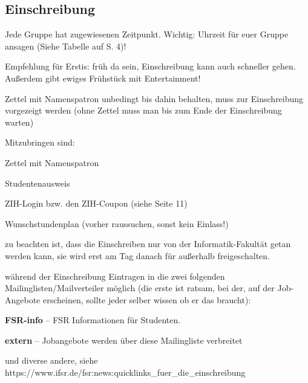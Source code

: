 \documentclass[a4paper,12pt]{report}
\begin{document}
\subsection{Einschreibung}
\begin{itemize*}
    \item Jede Gruppe hat zugewiesenen Zeitpunkt. Wichtig: Uhrzeit für euer Gruppe ansagen (Siehe Tabelle auf S. 4)!
    \item Empfehlung für Erstis: früh da sein, Einschreibung kann auch schneller gehen. Außerdem gibt ewiges Frühstück mit Entertainment!
    \item Zettel mit Namenspatron unbedingt bis dahin behalten, muss zur Einschreibung vorgezeigt werden (ohne Zettel muss man bis zum Ende der Einschreibung warten)
    \item Mitzubringen sind:
        \begin{itemize*}
        \item Zettel mit Namenspatron
        \item Studentenausweis
        \item ZIH-Login bzw. den ZIH-Coupon (siehe Seite 11)
        \item Wunschstundenplan (vorher raussuchen, sonst kein Einlass!)
        \item zu beachten ist, dass die Einschreiben nur von der Informatik-Fakultät getan werden kann, sie wird erst am Tag danach für außerhalb freigeschalten.
    \end{itemize*}
    \item während der Einschreibung Eintragen in die zwei folgenden Mailinglisten/Mailverteiler möglich (die erste ist ratsam, bei der, auf der Job-Angebote erscheinen, sollte jeder selber wissen ob er das braucht):
        \begin{itemize*}
        \item \textbf{FSR-info} -- FSR Informationen für Studenten.
        \item \textbf{extern} -- Jobangebote werden über diese Mailingliste verbreitet
        \item und diverse andere, siehe \\ https://www.ifsr.de/fsr:news:quicklinks\_fuer\_die\_einschreibung
    \end{itemize*}
\end{itemize*}
\end{document}
